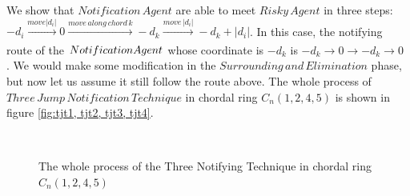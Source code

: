 We show that $Notification\,Agent$ are able to meet $Risky\,Agent$ in three steps: $-d_i\xrightarrow[]{move\left | d_i \right |}0\xrightarrow[]{move\,along\,chord\,k}-d_k\xrightarrow[]{move\,\left | d_i \right |}-d_k+\left|d_i\right|$. In this case, the notifying route of the $Notification\,\\Agent$ whose coordinate is $-d_k$ is $-d_k{\rightarrow}0{\rightarrow}-d_k{\rightarrow}0$ . We would make some modification in the $Surrounding\,and\,Elimination$ phase, but now let us assume it still follow the route above. The whole process of $Three\,Jump\,Notification\, Technique$ in chordal ring $C_n(1, 2, 4, 5)$ is shown in figure \ref{fig:tjt1, tjt2, tjt3, tjt4}. 

\begin{figure} [H]
  \centering 
  \hspace{1in} 
   \
  \hspace{1in} 
  \hspace{1in} 
  \caption{The whole process of the Three Notifying Technique in chordal ring $C_n(1, 2, 4, 5)$} 
  \label{fig:subfig} %
\end{figure}

